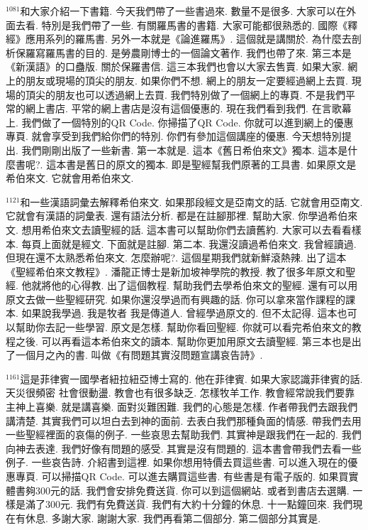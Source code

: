 \documentclass{book}
\begin{document}
$^{1081}$和大家介紹一下書籍.
今天我們帶了一些書過來.
數量不是很多.
大家可以在外面去看.
特別是我們帶了一些.
有關羅馬書的書籍.
大家可能都很熟悉的.
國際《釋經》應用系列的羅馬書.
另外一本就是《論進羅馬》.
這個就是講關於.
為什麼去剖析保羅寫羅馬書的目的.
是勞農剛博士的一個論文著作.
我們也帶了來.
第三本是《新漢語》的口蠱版.
關於保羅書信.
這三本我們也會以大家去售賣.
如果大家.
網上的朋友或現場的頂尖的朋友.
如果你們不想.
網上的朋友一定要經過網上去買.
現場的頂尖的朋友也可以透過網上去買.
我們特別做了一個網上的專頁.
不是我們平常的網上書店.
平常的網上書店是沒有這個優惠的.
現在我們看到我們.
在言歌幕上.
我們做了一個特別的QR Code.
你掃描了QR Code.
你就可以進到網上的優惠專頁.
就會享受到我們給你們的特別.
你們有參加這個講座的優惠.
今天想特別提出.
我們剛剛出版了一些新書.
第一本就是.
這本《舊日希伯來文》獨本.
這本是什麼書呢?.
這本書是舊日的原文的獨本.
即是聖經幫我們原著的工具書.
如果原文是希伯來文.
它就會用希伯來文.

$^{1121}$和一些漢語詞彙去解釋希伯來文.
如果那段經文是亞南文的話.
它就會用亞南文.
它就會有漢語的詞彙表.
還有語法分析.
都是在註腳那裡.
幫助大家.
你學過希伯來文.
想用希伯來文去讀聖經的話.
這本書可以幫助你們去讀舊約.
大家可以去看看樣本.
每頁上面就是經文.
下面就是註腳.
第二本.
我還沒讀過希伯來文.
我曾經讀過.
但現在還不太熟悉希伯來文.
怎麼辦呢?.
這個星期我們就新鮮滾熱辣.
出了這本《聖經希伯來文教程》.
潘龍正博士是新加坡神學院的教授.
教了很多年原文和聖經.
他就將他的心得教.
出了這個教程.
幫助我們去學希伯來文的聖經.
還有可以用原文去做一些聖經研究.
如果你還沒學過而有興趣的話.
你可以拿來當作課程的課本.
如果說我學過.
我是牧者 我是傳道人.
曾經學過原文的.
但不太記得.
這本也可以幫助你去記一些學習.
原文是怎樣.
幫助你看回聖經.
你就可以看完希伯來文的教程之後.
可以再看這本希伯來文的讀本.
幫助你更加用原文去讀聖經.
第三本也是出了一個月之內的書.
叫做《有問題其實沒問題宣講哀告詩》.

$^{1161}$這是菲律賓一國學者紐拉紐亞博士寫的.
他在菲律賓.
如果大家認識菲律賓的話.
天災很頻密 社會很動盪.
教會也有很多缺乏.
怎樣牧羊工作.
教會經常說我們要靠主神上喜樂.
就是講喜樂.
面對災難困難.
我們的心態是怎樣.
作者帶我們去跟我們講清楚.
其實我們可以坦白去到神的面前.
去表白我們那種負面的情感.
帶我們去用一些聖經裡面的哀傷的例子.
一些哀思去幫助我們.
其實神是跟我們在一起的.
我們向神去表達.
我們好像有問題的感受.
其實是沒有問題的.
這本書會帶我們去看一些例子.
一些哀告詩.
介紹書到這裡.
如果你想用特價去買這些書.
可以進入現在的優惠專頁.
可以掃描QR Code.
可以進去購買這些書.
有些書是有電子版的.
如果買實體書夠300元的話.
我們會安排免費送貨.
你可以到這個網站.
或者到書店去選購.
一樣是滿了300元.
我們有免費送貨.
我們有大約十分鐘的休息.
十一點鐘回來.
我們現在有休息.
多謝大家.
謝謝大家.
我們再看第二個部分.
第二個部分其實是.
\end{document}
